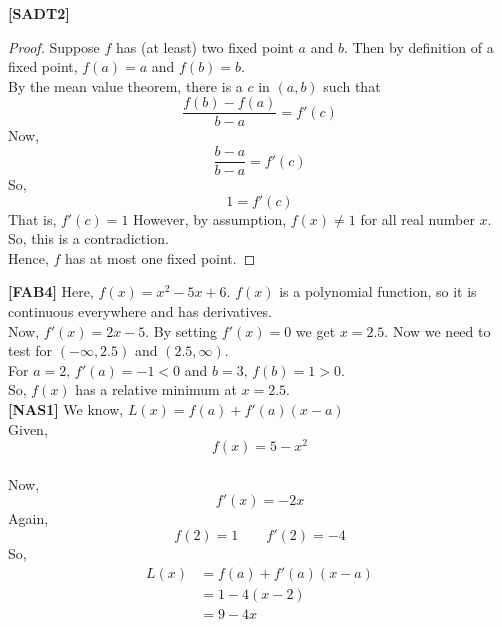 \documentclass[12pt]{article}
\theoremstyle{definition}
\begin{document}
\textbf{[SADT2]}
\begin{proof}
    Suppose \(f\) has (at least) two fixed point \(a\) and \(b\). Then by definition of a fixed point, \(f(a)=a\) and \(f(b)=b\).\\
    By the mean value theorem, there is a \(c\) in \((a,b)\) such that
    \[\frac{f(b)-f(a)}{b-a}=f'(c)\]
    Now, 
    \[\frac{b-a}{b-a}=f'(c)\]
    So,\[1=f'(c)\]
    That is, \(f'(c)=1\) However, by assumption, \(f(x)\neq 1\) for all real number \(x\). So, this is a contradiction.\\
    Hence, \(f\) has at most one fixed point.
\end{proof}
\textbf{[FAB4]} Here, \(f(x)=x^2-5x+6\). \(f(x)\) is a polynomial function, so it is continuous everywhere and has derivatives.\\
Now, \(f'(x)=2x-5\). By setting \(f'(x)=0\) we get \(x=2.5\). Now we need to test for \((-\infty, 2.5)\) and \((2.5,\infty)\). \\
For \(a=2,\, f'(a)=-1<0\) and \(b=3,\,f(b)=1>0\).\\
So, \(f(x)\) has a relative minimum at \(x=2.5\).\\

\textbf{[NAS1]} We know, \(L(x)=f(a)+f'(a)(x-a)\)\\
Given, \[f(x)=5-x^2\]\\
Now, \[f'(x)=-2x\]
Again, \[f(2)=1\qquad f'(2)=-4\]
So,
\begin{align*}
    L(x)&=f(a)+f'(a)(x-a)\\
    &=1-4(x-2)\\
    &=9-4x
\end{align*}
\end{document}
